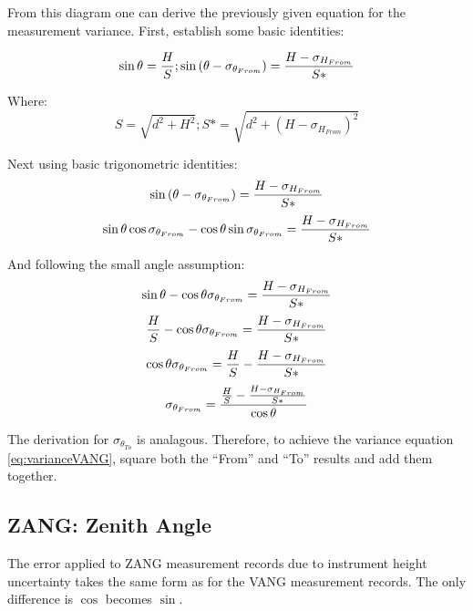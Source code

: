 From this diagram one can derive the previously given equation for the measurement variance. First, establish some basic identities:

\begin{equation}\label{eq:sin} %
    \sin\theta = \f{H}{S}; \sin\left(\theta-\sigma_{\theta_{From}}\right) = \f{H-\sigma_{H_{From}}}{S*}
\end{equation}

Where:
\begin{equation}\label{eq:s_sPrime} %
    S = \sqrt{d^2 + H^2}; S* = \sqrt{d^2 + (H-\sigma_{H_{From}})^2}
\end{equation}

Next using basic trigonometric identities:
\begin{equation}\label{eq:sin_start} %
    \sin\left(\theta-\sigma_{\theta_{From}}\right) = \f{H-\sigma_{H_{From}}}{S*}
\end{equation}
\begin{equation}
    \sin\theta\cos\sigma_{\theta_{From}} - \cos\theta\sin\sigma_{\theta_{From}} = \frac{H-\sigma_{H_{From}}}{S*}
\end{equation}

And following the small angle assumption:
\begin{equation}\label{eq:small_angle_assumption} %
    \sin\theta - \cos\theta\sigma_{\theta_{From}} = \f{H-\sigma_{H_{From}}}{S*}
\end{equation}
\begin{equation}
    \frac{H}{S} - \cos\theta\sigma_{\theta_{From}} = \frac{H-\sigma_{H_{From}}}{S*}
\end{equation}
\begin{equation}
    \cos\theta\sigma_{\theta_{From}} = \frac{H}{S} - \frac{H-\sigma_{H_{From}}}{S*}
\end{equation}
\begin{equation}
    \sigma_{\theta_{From}} = \frac{\frac{H}{S}- \frac{H-\sigma_{H_{From}}}{S*}}{\cos\theta}
\end{equation}

The derivation for $\sigma_{\theta_{To}}$ is analagous. Therefore, to achieve the variance equation \ref{eq:varianceVANG}, square both the ``From'' and ``To'' results and add them together.


\subsection{ZANG: Zenith Angle}
The error applied to ZANG measurement records due to instrument height uncertainty takes the same form as for the VANG measurement records. The only difference is $\cos$ becomes $\sin$.
